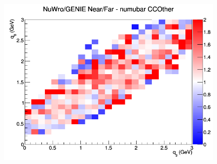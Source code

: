 \begin{figure}[h]
\endminipage
{}
\includegraphics[width=\linewidth]{eff_q0_q3/LAr/ratios/CCOther_NuWro_GENIE_numubar_NF_q3_q0.png}
\endminipage
\newline
\end{figure}
\clearpage
